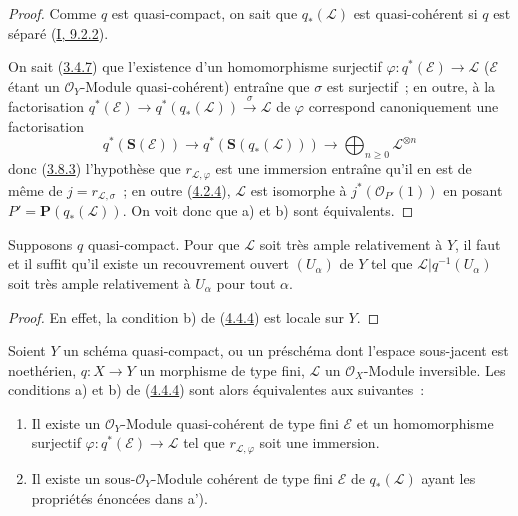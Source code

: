 \begin{proof}
Comme $q$ est quasi-compact, on sait que $q_*(\mathcal{L})$ est quasi-cohérent
si $q$ est séparé (\hyperref[I.9.2.2-fr]{I, 9.2.2}).


On sait (\hyperref[II.3.4.7-fr]{3.4.7}) que l'existence d'un homomorphisme
surjectif $\varphi:q^*(\mathcal{E})\to\mathcal{L}$ ($\mathcal{E}$ étant un
$\mathcal{O}_Y$-Module quasi-cohérent) entraîne que $\sigma$ est surjectif~;
en outre, à la factorisation
$q^*(\mathcal{E})\to q^*(q_*(\mathcal{L}))\xrightarrow{\sigma}\mathcal{L}$
de $\varphi$ correspond canoniquement une factorisation
\[
  q^*(\mathbf{S}(\mathcal{E}))
    \longrightarrow q^*(\mathbf{S}(q_*(\mathcal{L})))
    \longrightarrow\bigoplus_{n\geq0}\mathcal{L}^{\otimes n}
\]
donc (\hyperref[II.3.8.3-fr]{3.8.3}) l'hypothèse que
$r_{\mathcal{L},\varphi}$ est une immersion entraîne qu'il en est de même de
$j=r_{\mathcal{L},\sigma}$~; en outre
(\hyperref[II.4.2.4-fr]{4.2.4}), $\mathcal{L}$ est isomorphe à
$j^*(\mathcal{O}_{P'}(1))$ en posant
$P'=\mathbf{P}(q_*(\mathcal{L}))$. On voit donc que a) et b) sont
équivalents.
\end{proof}

\begin{corollary}[4.4.5]
\label{II.4.4.5-fr}
Supposons $q$ quasi-compact. Pour que $\mathcal{L}$ soit très ample
relativement à $Y$, il faut et il suffit qu'il existe un recouvrement ouvert
$(U_\alpha)$ de $Y$ tel que
$\mathcal{L}|q^{-1}(U_\alpha)$ soit très ample relativement à $U_\alpha$ pour
tout $\alpha$.
\end{corollary}

\begin{proof}
En effet, la condition b) de (\hyperref[II.4.4.4-fr]{4.4.4}) est locale sur
$Y$.
\end{proof}

\begin{proposition}[4.4.6]
\label{II.4.4.6-fr}
Soient $Y$ un schéma quasi-compact, ou un préschéma dont l'espace sous-jacent
est noethérien, $q:X\to Y$ un morphisme de type fini, $\mathcal{L}$ un
$\mathcal{O}_X$-Module inversible. Les conditions a) et b) de
(\hyperref[II.4.4.4-fr]{4.4.4}) sont alors équivalentes aux suivantes~:
\begin{enumerate}
  \item[\rm{a')}] Il existe un $\mathcal{O}_Y$-Module quasi-cohérent de type
  fini $\mathcal{E}$ et un homomorphisme surjectif
  $\varphi:q^*(\mathcal{E})\to\mathcal{L}$ tel que
  $r_{\mathcal{L},\varphi}$ soit une immersion.
  \item[\rm{b')}] Il existe un sous-$\mathcal{O}_Y$-Module cohérent de type
  fini $\mathcal{E}$ de $q_*(\mathcal{L})$ ayant les propriétés énoncées dans
  a').
\end{enumerate}
\end{proposition}

